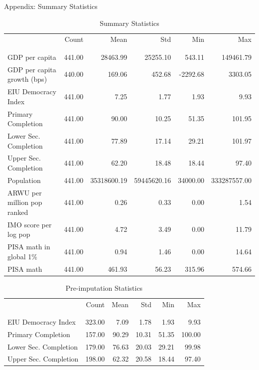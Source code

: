 \documentclass[10pt]{beamer}
\begin{document}
\begin{frame}{Appendix: Summary Statistics}
    \begin{table}
        \caption{Summary Statistics}
        \resizebox{\linewidth}{!} {
            \begin{tabular}{lrrrrr}
                & Count & Mean & Std & Min & Max \\
                \\[-1.8ex]\hline
                \hline \\[-1.8ex]
               GDP per capita & 441.00 & 28463.99 & 25255.10 & 543.11 & 149461.79 \\
               GDP per capita growth (bps) & 440.00 & 169.06 & 452.68 & -2292.68 & 3303.05 \\
               EIU Democracy Index & 441.00 & 7.25 & 1.77 & 1.93 & 9.93 \\
               Primary Completion & 441.00 & 90.00 & 10.25 & 51.35 & 101.95 \\
               Lower Sec. Completion & 441.00 & 77.89 & 17.14 & 29.21 & 101.97 \\
               Upper Sec. Completion & 441.00 & 62.20 & 18.48 & 18.44 & 97.40 \\
               Population & 441.00 & 35318600.19 & 59445620.16 & 34000.00 & 333287557.00 \\
               ARWU per million pop ranked & 441.00 & 0.26 & 0.33 & 0.00 & 1.54 \\
               IMO score per log pop & 441.00 & 4.72 & 3.49 & 0.00 & 11.79 \\
               PISA math in global 1\% & 441.00 & 0.94 & 1.46 & 0.00 & 14.64 \\
               PISA math & 441.00 & 461.93 & 56.23 & 315.96 & 574.66 \\
               \end{tabular}
        }
    \end{table}
    \begin{table}
        \tiny
        \caption{Pre-imputation Statistics}
        \begin{tabular}{lrrrrr}
         & Count & Mean & Std & Min & Max \\
         \\[-1.8ex]\hline
         \hline \\[-1.8ex]
        EIU Democracy Index & 323.00 & 7.09 & 1.78 & 1.93 & 9.93 \\
        Primary Completion & 157.00 & 90.29 & 10.31 & 51.35 & 100.00 \\
        Lower Sec. Completion & 179.00 & 76.63 & 20.03 & 29.21 & 99.98 \\
        Upper Sec. Completion & 198.00 & 62.32 & 20.58 & 18.44 & 97.40 \\
        \end{tabular}
        \end{table}
\end{frame}
\end{document}
